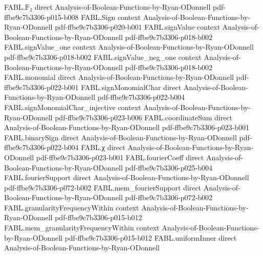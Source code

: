 \begin{theorem}
\label{FABL.toBooleanFunction_parityDepthCircuitFromBlocks}
\leanok
{}
\proofstep
  {FABL.𝔽₂}
  {direct}
  {Analysis-of-Boolean-Functions-by-Ryan-ODonnell}
  {pdf-ffbe9c7b3306-p015-b008}
\proofstep
  {FABL.Sign}
  {context}
  {Analysis-of-Boolean-Functions-by-Ryan-ODonnell}
  {pdf-ffbe9c7b3306-p020-b001}
\proofstep
  {FABL.signValue}
  {context}
  {Analysis-of-Boolean-Functions-by-Ryan-ODonnell}
  {pdf-ffbe9c7b3306-p018-b002}
\proofstep
  {FABL.signValue_one}
  {context}
  {Analysis-of-Boolean-Functions-by-Ryan-ODonnell}
  {pdf-ffbe9c7b3306-p018-b002}
\proofstep
  {FABL.signValue_neg_one}
  {context}
  {Analysis-of-Boolean-Functions-by-Ryan-ODonnell}
  {pdf-ffbe9c7b3306-p018-b002}
\proofstep
  {FABL.monomial}
  {direct}
  {Analysis-of-Boolean-Functions-by-Ryan-ODonnell}
  {pdf-ffbe9c7b3306-p022-b001}
\proofstep
  {FABL.signMonomialChar}
  {direct}
  {Analysis-of-Boolean-Functions-by-Ryan-ODonnell}
  {pdf-ffbe9c7b3306-p022-b004}
\proofstep
  {FABL.signMonomialChar_injective}
  {context}
  {Analysis-of-Boolean-Functions-by-Ryan-ODonnell}
  {pdf-ffbe9c7b3306-p023-b006}
\proofstep
  {FABL.coordinateSum}
  {direct}
  {Analysis-of-Boolean-Functions-by-Ryan-ODonnell}
  {pdf-ffbe9c7b3306-p023-b001}
\proofstep
  {FABL.binarySign}
  {direct}
  {Analysis-of-Boolean-Functions-by-Ryan-ODonnell}
  {pdf-ffbe9c7b3306-p022-b004}
\proofstep
  {FABL.χ}
  {direct}
  {Analysis-of-Boolean-Functions-by-Ryan-ODonnell}
  {pdf-ffbe9c7b3306-p023-b001}
\proofstep
  {FABL.fourierCoeff}
  {direct}
  {Analysis-of-Boolean-Functions-by-Ryan-ODonnell}
  {pdf-ffbe9c7b3306-p025-b004}
\proofstep
  {FABL.fourierSupport}
  {direct}
  {Analysis-of-Boolean-Functions-by-Ryan-ODonnell}
  {pdf-ffbe9c7b3306-p072-b002}
\proofstep
  {FABL.mem_fourierSupport}
  {direct}
  {Analysis-of-Boolean-Functions-by-Ryan-ODonnell}
  {pdf-ffbe9c7b3306-p072-b002}
\proofstep
  {FABL.granularityFrequencyWithin}
  {context}
  {Analysis-of-Boolean-Functions-by-Ryan-ODonnell}
  {pdf-ffbe9c7b3306-p015-b012}
\proofstep
  {FABL.mem_granularityFrequencyWithin}
  {context}
  {Analysis-of-Boolean-Functions-by-Ryan-ODonnell}
  {pdf-ffbe9c7b3306-p015-b012}
\proofstep
  {FABL.uniformInner}
  {direct}
  {Analysis-of-Boolean-Functions-by-Ryan-ODonnell}

\end{theorem}
